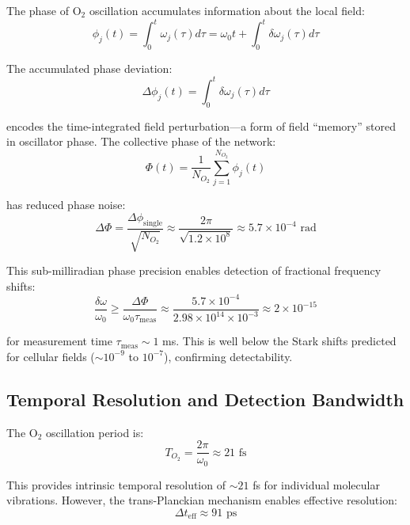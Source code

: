 \documentclass[twocolumn,10pt,aps,prd,superscriptaddress,floatfix,nofootinbib]{revtex4-2}
\theoremstyle{remark}
\begin{document}
The phase of O$_2$ oscillation accumulates information about the local field:
\begin{equation}
\phi_j(t) = \int_0^t \omega_j(\tau) d\tau = \omega_0 t + \int_0^t \delta\omega_j(\tau) d\tau
\label{eq:phase_accumulation}
\end{equation}

The accumulated phase deviation:
\begin{equation}
\Delta\phi_j(t) = \int_0^t \delta\omega_j(\tau) d\tau
\end{equation}

encodes the time-integrated field perturbation---a form of field ``memory'' stored in oscillator phase. The collective phase of the network:
\begin{equation}
\Phi(t) = \frac{1}{N_{O_2}} \sum_{j=1}^{N_{O_2}} \phi_j(t)
\end{equation}

has reduced phase noise:
\begin{equation}
\Delta\Phi = \frac{\Delta\phi_{\mathrm{single}}}{\sqrt{N_{O_2}}} \approx \frac{2\pi}{\sqrt{1.2 \times 10^8}} \approx 5.7 \times 10^{-4} \text{ rad}
\end{equation}

This sub-milliradian phase precision enables detection of fractional frequency shifts:
\begin{equation}
\frac{\delta\omega}{\omega_0} \geq \frac{\Delta\Phi}{\omega_0 \tau_{\mathrm{meas}}} \approx \frac{5.7 \times 10^{-4}}{2.98 \times 10^{14} \times 10^{-3}} \approx 2 \times 10^{-15}
\end{equation}

for measurement time $\tau_{\mathrm{meas}} \sim 1$ ms. This is well below the Stark shifts predicted for cellular fields ($\sim 10^{-9}$ to $10^{-7}$), confirming detectability.

\subsection{Temporal Resolution and Detection Bandwidth}

The O$_2$ oscillation period is:
\begin{equation}
T_{O_2} = \frac{2\pi}{\omega_0} \approx 21 \text{ fs}
\end{equation}

This provides intrinsic temporal resolution of $\sim 21$ fs for individual molecular vibrations. However, the trans-Planckian mechanism enables effective resolution:
\begin{equation}
\Delta t_{\mathrm{eff}} \approx 91 \text{ ps}
\end{equation}
\end{document}
